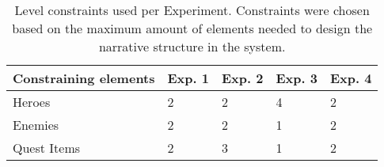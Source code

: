 \begin{table}[]
\caption{Level constraints used per Experiment. Constraints were chosen based on the maximum amount of elements needed to design the narrative structure in the system.}
\begin{tabular}{l|llll}
Constraining elements & Exp. 1 & Exp. 2 & Exp. 3 & Exp. 4 \\ \hline
Heroes                & 2            & 2            & 4            & 2            \\
Enemies               & 2            & 2            & 1            & 2            \\
Quest Items           & 2            & 3            & 1            & 2           
\end{tabular}
\label{tab:level-constraints}
\end{table}